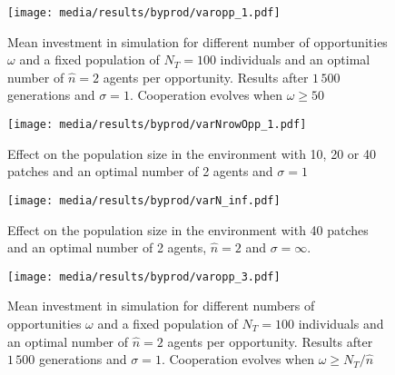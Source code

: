 \documentclass[twocolumn]{article}
\begin{document}
\begin{figure}[htbp]
    \centering
    \texttt{[image: media/results/byprod/varopp\_1.pdf]}
    \caption{Mean investment in simulation for different number of opportunities $\omega$ and a fixed population of $N_T=100$ individuals and an optimal number of $\hat{n} = 2$ agents per opportunity. Results after $1\,500$ generations and $\sigma = 1$. Cooperation evolves when $\omega \geq 50$}

    \label{fig:varyingopptol1}
\end{figure}

\begin{figure*}
    \centering
    \texttt{[image: media/results/byprod/varNrowOpp\_1.pdf]}
    \caption{Effect on the population size in the environment with 10, 20 or 40 patches and an optimal number of 2 agents and $\sigma = 1$}
    \label{fig:varNrowOpptol1}
\end{figure*}

\begin{figure}
    \centering
    \texttt{[image: media/results/byprod/varN\_inf.pdf]}
    \caption{Effect on the population size in the environment with 40 patches and an optimal number of 2 agents, $\hat{n} = 2$ and $\sigma = \infty$.}
    \label{fig:varNrowtolinf}
\end{figure}

\begin{figure}[htbp]
    \centering
    \texttt{[image: media/results/byprod/varopp\_3.pdf]}
    \caption{Mean investment in simulation for different numbers of opportunities $\omega$ and a fixed population of $N_T=100$ individuals and an optimal number of $\hat{n} = 2$ agents per opportunity. Results after $1\,500$ generations and $\sigma = 1$. Cooperation evolves when $\omega \geq N_T/\hat{n}$}

    \label{fig:varyingopptol3}
\end{figure}
\end{document}
